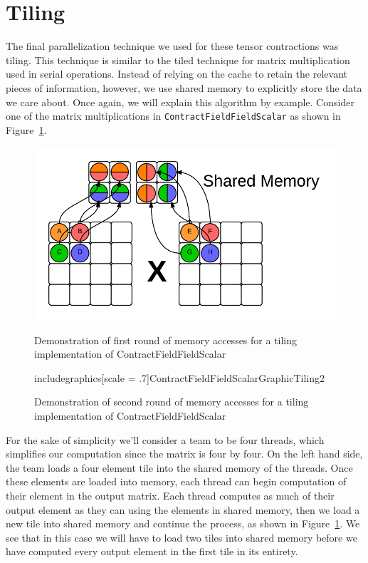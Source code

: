 \section{Tiling}\label{sec:tiling}

The final parallelization technique we used for these tensor contractions was
tiling. This technique is similar to the tiled technique for matrix
multiplication used in serial operations. Instead of relying on the cache to
retain the relevant pieces of information, however, we use shared memory to
explicitly store the data we care about. Once again, we will explain this
algorithm by example. Consider one of the matrix multiplications in
\texttt{ContractFieldFieldScalar} as shown in Figure~\ref{fig:Tiling}. 


\begin{figure}[ht]
    \centering
    \includegraphics[scale = .7]{ContractFieldFieldScalarGraphicTiling}
    \caption{Demonstration of first round of memory accesses for a tiling implementation of ContractFieldFieldScalar}
    
    includegraphics[scale = .7]{ContractFieldFieldScalarGraphicTiling2}
    \caption{Demonstration of second round of memory accesses for a tiling implementation of ContractFieldFieldScalar}
\label{fig:Tiling}
\end{figure}

For the sake of simplicity we'll consider a team to be four threads, which
simplifies our computation since the matrix is four by four. On the left hand
side, the team loads a four element tile into the shared memory of the
threads. Once these elements are loaded into memory, each thread can begin
computation of their element in the output matrix. Each thread computes as much
of their output element as they can using the elements in shared memory, then
we load a new tile into shared memory and continue the process, as shown in Figure~\ref{fig:Tiling}.
We see that in this case we will have to load two tiles into shared memory
before we have computed every output element in the first tile in its entirety. 


